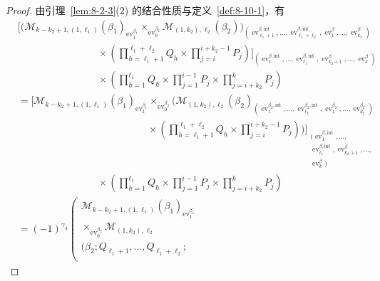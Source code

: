\begin{proof}
由引理~\ref{lem:8-2-3}(2) 的结合性质与定义~\ref{def:8-10-1}，有
\begingroup
\small
\[
\begin{aligned}
&\Bigg[
\Bigg(
\mathcal M_{k-k_2+1,(1,\ell_1)}(\beta_1)_
{\operatorname{ev}_1^{\beta_1}}
\mathop{\times}_{\operatorname{ev}_0^{\beta_2}}
\mathcal M_{(1,k_2),\ell_2}(\beta_2)
\Bigg)_
{(\operatorname{ev}_{\ell_1+1}^{\beta,\mathrm{int}},\ldots,
\operatorname{ev}_{\ell_1+\ell_2}^{\beta,\mathrm{int}},
\operatorname{ev}_1^\beta,\ldots,\operatorname{ev}_{k_2}^\beta)}\\[-2pt]
&\hspace{8em}{}\times
\left(\prod_{h=\ell_1+1}^{\ell_1+\ell_2}Q_h
\times\prod_{j=i}^{i+k_2-1}P_j\right)
\Bigg]_
{(\operatorname{ev}_1^{\beta,\mathrm{int}},\ldots,
\operatorname{ev}_{\ell_1}^{\beta,\mathrm{int}},
\operatorname{ev}_{k_2+1}^\beta,\ldots,\operatorname{ev}_k^\beta)}\\[-2pt]
&\hspace{8em}{}\times
\left(\prod_{h=1}^{\ell_1}Q_h
\times\prod_{j=1}^{i-1}P_j
\times\prod_{j=i+k_2}^{k}P_j\right)\\
&={}
\Bigg[
\mathcal M_{k-k_2+1,(1,\ell_1)}(\beta_1)_
{\operatorname{ev}_1^{\beta_1}}
\mathop{\times}_{\operatorname{ev}_0^{\beta_2}}
\Bigg(
\mathcal M_{(1,k_2),\ell_2}(\beta_2)_
{(\operatorname{ev}_1^{\beta_2,\mathrm{int}},\ldots,
\operatorname{ev}_{\ell_2}^{\beta_2,\mathrm{int}},
\operatorname{ev}_1^{\beta_2},\ldots,
\operatorname{ev}_{k_2}^{\beta_2})}\\[-2pt]
&\hspace{13em}{}\times
\left(\prod_{h=\ell_1+1}^{\ell_1+\ell_2}Q_h
\times\prod_{j=i}^{i+k_2-1}P_j\right)
\Bigg)\Bigg]_
{\substack{(\operatorname{ev}_1^{\beta,\mathrm{int}},\ldots,\\
\operatorname{ev}_{\ell_1}^{\beta,\mathrm{int}},
\operatorname{ev}_{k_2+1}^\beta,\ldots,\\
\operatorname{ev}_k^\beta)}}\\[-2pt]
&\hspace{8em}{}\times
\left(\prod_{h=1}^{\ell_1}Q_h
\times\prod_{j=1}^{i-1}P_j
\times\prod_{j=i+k_2}^{k}P_j\right)\\
&={}(-1)^{\gamma_4}
\left(
\begin{gathered}
\mathcal M_{k-k_2+1,(1,\ell_1)}(\beta_1)_
{\operatorname{ev}_1^{\beta_1}}\\[-2pt]
{}\mathop{\times}_{\operatorname{ev}_0^{\beta_2}}
\mathcal M_{(1,k_2),\ell_2}\\[-2pt]
(\beta_2;Q_{\ell_1+1},\ldots,Q_{\ell_1+\ell_2};\\[-2pt]

\end{gathered}
\end{aligned}\]
\end{proof}

